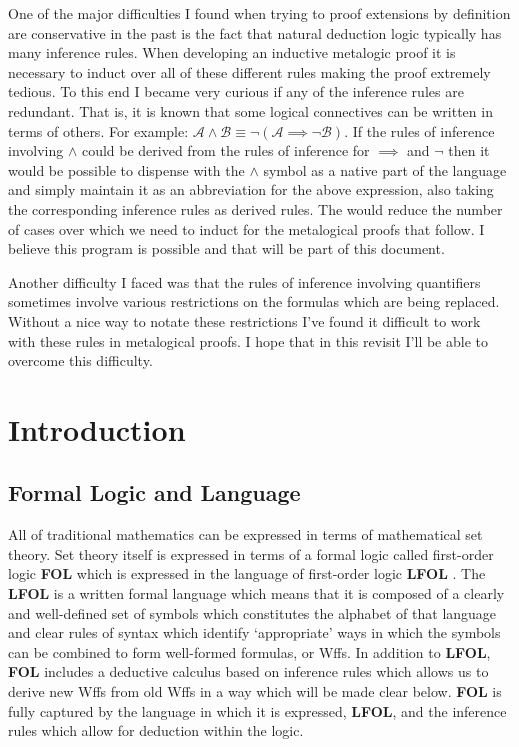 \documentclass[12pt]{article}
\theoremstyle{break}
\theoremstyle{break}
\theoremstyle{break}
\theoremstyle{break}
\newcommand{\mc}[1]{\mathcal{#1}}
\begin{document}
One of the major difficulties I found when trying to proof extensions by definition are conservative in the past is the fact that natural deduction logic typically has many inference rules.
When developing an inductive metalogic proof it is necessary to induct over all of these different rules making the proof extremely tedious.
To this end I became very curious if any of the inference rules are redundant.
That is, it is known that some logical connectives can be written in terms of others.
For example: $\mc{A}\land\mc{B} \equiv \lnot(\mc{A}\implies \lnot\mc{B})$.
If the rules of inference involving $\land$ could be derived from the rules of inference for $\implies$ and $\lnot$ then it would be possible to dispense with the $\land$ symbol as a native part of the language and simply maintain it as an abbreviation for the above expression, also taking the corresponding inference rules as derived rules.
The would reduce the number of cases over which we need to induct for the metalogical proofs that follow.
I believe this program is possible and that will be part of this document.

Another difficulty I faced was that the rules of inference involving quantifiers sometimes involve various restrictions on the formulas which are being replaced.
Without a nice way to notate these restrictions I've found it difficult to work with these rules in metalogical proofs.
I hope that in this revisit I'll be able to overcome this difficulty.


\newpage
\section{Introduction}

\subsection{Formal Logic and Language}
All of traditional mathematics can be expressed in terms of mathematical set theory. 
Set theory itself is expressed in terms of a formal logic called first-order logic \textbf{FOL} which is expressed in the language of first-order logic \textbf{LFOL} .
The \textbf{LFOL} is a written formal language which means that it is composed of a clearly and well-defined set of symbols which constitutes the alphabet of that language and clear rules of syntax which identify `appropriate' ways in which the symbols can be combined to form well-formed formulas, or Wffs.
In addition to \textbf{LFOL}, \textbf{FOL} includes a deductive calculus based on inference rules which allows us to derive new Wffs from old Wffs in a way which will be made clear below.
\textbf{FOL} is fully captured by the language in which it is expressed, \textbf{LFOL}, and the inference rules which allow for deduction within the logic.
\end{document}
